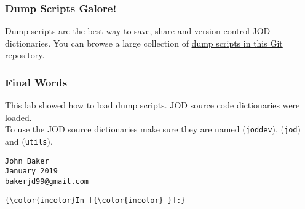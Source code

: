 \documentclass[11pt,letter,landscape]{article}
\begin{document}
    \subsubsection{Dump Scripts Galore!}\label{dump-scripts-galore}

Dump scripts are the best way to save, share and version control JOD
dictionaries. You can browse a large collection of
\href{https://github.com/bakerjd99/joddumps}{dump scripts in this Git
repository}.

    \subsubsection{Final Words}\label{final-words}

This lab showed how to load dump scripts. JOD source code dictionaries
were loaded.\\
To use the JOD source dictionaries make sure they are named
(\texttt{joddev}), (\texttt{jod}) and (\texttt{utils}).

\begin{verbatim}
John Baker
January 2019
bakerjd99@gmail.com
\end{verbatim}

    \begin{Verbatim}[commandchars=\\\{\}]
{\color{incolor}In [{\color{incolor} }]:} 
\end{Verbatim}


    
    
    
    
\end{document}
